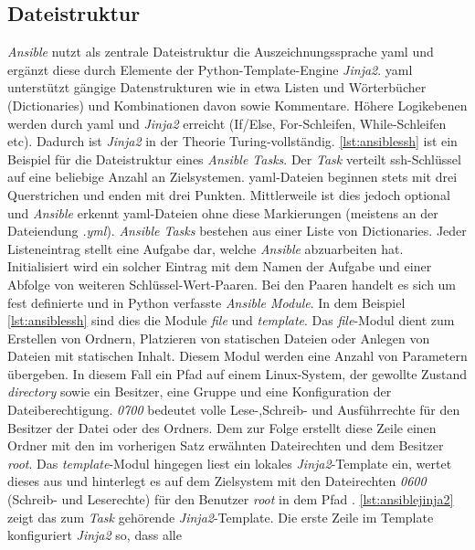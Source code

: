 \documentclass[titlepage]{report}
\begin{document}
\subsection{Dateistruktur}
\emph{Ansible} nutzt als zentrale Dateistruktur die Auszeichnungssprache
\gls{yaml} und ergänzt diese durch Elemente der
Python\hyp{}Template\hyp{}Engine \emph{Jinja2}. \gls{yaml} unterstützt
gängige Datenstrukturen wie in etwa Listen und Wörterbücher
(Dictionaries) und Kombinationen davon sowie Kommentare. Höhere
Logikebenen werden durch \gls{yaml} und \emph{Jinja2} erreicht (If/Else,
For\hyp{}Schleifen, While\hyp{}Schleifen etc). Dadurch ist \emph{Jinja2}
in der Theorie Turing-vollständig. \autoref{lst:ansiblessh} ist ein
Beispiel für die Dateistruktur eines \emph{Ansible Tasks}. Der
\emph{Task} verteilt \gls{ssh}\hyp{}Schlüssel auf eine beliebige Anzahl
an Zielsystemen.  \gls{yaml}\hyp{}Dateien beginnen stets mit drei
Querstrichen und enden mit drei Punkten.  Mittlerweile ist dies jedoch
optional und \emph{Ansible} erkennt \gls{yaml}\hyp{}Dateien ohne diese
Markierungen (meistens an der Dateiendung \emph{.yml}). \emph{Ansible
Tasks} bestehen aus einer Liste von Dictionaries. Jeder Listeneintrag
stellt eine Aufgabe dar, welche \emph{Ansible} abzuarbeiten hat.
Initialisiert wird ein solcher Eintrag mit dem Namen der Aufgabe und
einer Abfolge von weiteren Schlüssel\hyp{}Wert\hyp{}Paaren. Bei den
Paaren handelt es sich um fest definierte und in Python verfasste
\emph{Ansible Module}. In dem Beispiel \autoref{lst:ansiblessh} sind
dies die Module \emph{file} und \emph{template}. Das
\emph{file}\hyp{}Modul dient zum Erstellen von Ordnern, Platzieren von
statischen Dateien oder Anlegen von Dateien mit statischen Inhalt.
Diesem Modul werden eine Anzahl von Parametern übergeben. In diesem Fall
ein Pfad auf einem Linux\hyp{}System, der gewollte Zustand
\emph{directory} sowie ein Besitzer, eine Gruppe und eine Konfiguration
der Dateiberechtigung. \emph{0700} bedeutet volle
Lese\hyp{},Schreib\hyp{} und Ausführrechte für den Besitzer der Datei
oder des Ordners. Dem zur Folge erstellt diese Zeile einen Ordner mit
den im vorherigen Satz erwähnten Dateirechten und dem Besitzer
\emph{root}. Das \emph{template}\hyp{}Modul hingegen liest ein lokales
\emph{Jinja2}\hyp{}Template ein, wertet dieses aus und hinterlegt es auf
dem Zielsystem mit den Dateirechten \emph{0600} (Schreib\hyp{} und
Leserechte) für den Benutzer \emph{root} in dem Pfad
. \autoref{lst:ansiblejinja2}
zeigt das zum \emph{Task} gehörende \emph{Jinja2}\hyp{}Template. Die
erste Zeile im Template konfiguriert \emph{Jinja2} so, dass alle
\end{document}
